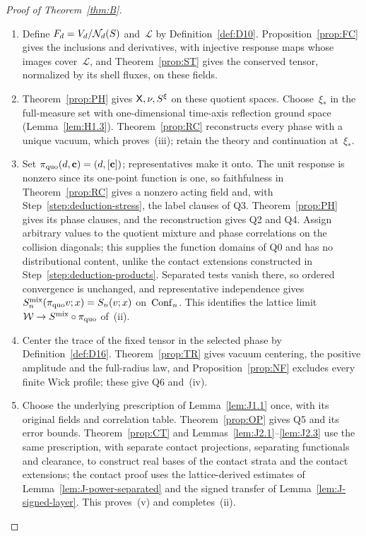 \begin{proof}[Proof of Theorem~\ref{thm:B}]
\begin{enumerate}[label=\textup{\arabic*.},ref=\arabic*,itemsep=0.25em]
\item\label{step:deduction-stress} Define $F_d=V_d/\mathcal{N}_{d}(S)$ and~$\mathcal L$ by Definition~\ref{def:D10}. Proposition~\ref{prop:FC} gives the inclusions and derivatives, with injective response maps whose images cover~$\mathcal L$, and Theorem~\ref{prop:ST} gives the conserved tensor, normalized by its shell fluxes, on these fields.

\item\label{step:deduction-phase} Theorem~\ref{prop:PH} gives $\mathsf{X},\nu,S^\xi$ on these quotient spaces. Choose~$\xi_*$ in the full-measure set with one-dimensional time-axis reflection ground space (Lemma~\ref{lem:H1.3}). Theorem~\ref{prop:RC} reconstructs every phase with a unique vacuum, which proves~(iii); retain the theory and continuation at~$\xi_*$.

\item\label{step:deduction-hierarchy} Set $\pi_{\rm quo}(d,\mathbf c)=(d,[\mathbf c])$; representatives make it onto. The unit response is nonzero since its one-point function is one, so faithfulness in Theorem~\ref{prop:RC} gives a nonzero acting field and, with Step~\ref{step:deduction-stress}, the label clauses of Q3. Theorem~\ref{prop:PH} gives its phase clauses, and the reconstruction gives Q2 and Q4. Assign arbitrary values to the quotient mixture and phase correlations on the collision diagonals; this supplies the function domains of Q0 and has no distributional content, unlike the contact extensions constructed in Step~\ref{step:deduction-products}. Separated tests vanish there, so ordered convergence is unchanged, and representative independence gives $S_n^{\rm mix}(\pi_{\rm quo}v;x)=S_n(v;x)$ on~$\mathrm{Conf}_{n}$. This identifies the lattice limit $\mathcal W\to S^{\rm mix}\circ\pi_{\rm quo}$ of~(ii).

\item\label{step:deduction-trace} Center the trace of the fixed tensor in the selected phase by Definition~\ref{def:D16}. Theorem~\ref{prop:TR} gives vacuum centering, the positive amplitude and the full-radius law, and Proposition~\ref{prop:NF} excludes every finite Wick profile; these give Q6 and~(iv).

\item\label{step:deduction-products} Choose the underlying prescription of Lemma~\ref{lem:J1.1} once, with its original fields and correlation table. Theorem~\ref{prop:OP} gives Q5 and its error bounds. Theorem~\ref{prop:CT} and Lemmas~\ref{lem:J2.1}--\ref{lem:J2.3} use the same prescription, with separate contact projections, separating functionals and clearance, to construct real bases of the contact strata and the contact extensions; the contact proof uses the lattice-derived estimates of Lemma~\ref{lem:J-power-separated} and the signed transfer of Lemma~\ref{lem:J-signed-layer}. This proves~(v) and completes~(ii).\qedhere
\end{enumerate}
\end{proof}


